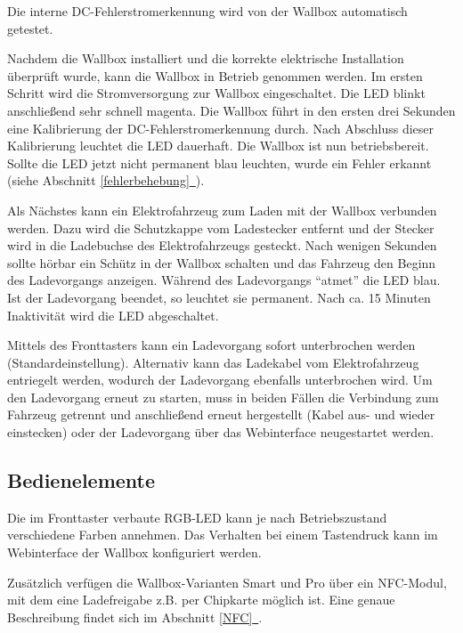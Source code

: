 \documentclass[a4paper,10pt]{article}
\newcommand*{\fullref}[1]{Abschnitt \hyperref[{#1}]{\ref*{#1}~\nameref*{#1}}}
\begin{document}
\begin{multicols*}{2}
    Die interne DC-Fehlerstromerkennung wird von der Wallbox automatisch getestet.

    Nachdem die Wallbox installiert
    und die korrekte elektrische Installation überprüft wurde, kann die Wallbox in
    Betrieb genommen werden.
    Im ersten Schritt wird die Stromversorgung zur Wallbox eingeschaltet. Die
    LED blinkt anschließend sehr schnell magenta. Die Wallbox führt
    in den ersten drei Sekunden eine Kalibrierung der
    DC-Fehlerstromerkennung durch. Nach Abschluss dieser Kalibrierung
    leuchtet die LED dauerhaft. Die Wallbox ist nun betriebsbereit. Sollte die LED jetzt
    nicht permanent blau leuchten, wurde ein Fehler erkannt (siehe \fullref{fehlerbehebung}).

    Als Nächstes kann ein Elektrofahrzeug zum Laden mit der Wallbox verbunden
    werden. Dazu wird die Schutzkappe vom Ladestecker entfernt und der Stecker
	wird in die Ladebuchse des Elektrofahrzeugs gesteckt. Nach wenigen Sekunden sollte hörbar
    ein Schütz in der Wallbox schalten und das Fahrzeug den Beginn
    des Ladevorgangs anzeigen. Während des Ladevorgangs \enquote{atmet} die LED blau.
    Ist der Ladevorgang beendet, so leuchtet sie permanent. Nach ca.
    15 Minuten Inaktivität wird die LED abgeschaltet.

	Mittels des Fronttasters kann ein Ladevorgang sofort unterbrochen werden (Standardeinstellung). Alternativ kann das Ladekabel vom Elektrofahrzeug entriegelt werden,
    wodurch der Ladevorgang ebenfalls unterbrochen wird. Um den Ladevorgang erneut
    zu starten, muss in beiden Fällen die Verbindung zum Fahrzeug getrennt und
    anschließend erneut hergestellt (Kabel aus- und wieder einstecken) oder der Ladevorgang über das Webinterface neugestartet werden.

    \vspace{-0.1cm}
    \subsection{Bedienelemente}\label{lockswitch}
	Die im Fronttaster verbaute RGB-LED kann je nach Betriebszustand
	verschiedene Farben annehmen.
	Das Verhalten bei einem Tastendruck kann im Webinterface der Wallbox konfiguriert werden.

    Zusätzlich verfügen die Wallbox-Varianten Smart und Pro über ein NFC-Modul,
	mit dem eine Ladefreigabe z.B. per Chipkarte möglich ist. Eine
    genaue Beschreibung findet sich im \fullref{NFC}.

    \vspace{-0.1cm}

\end{multicols*}
\end{document}
